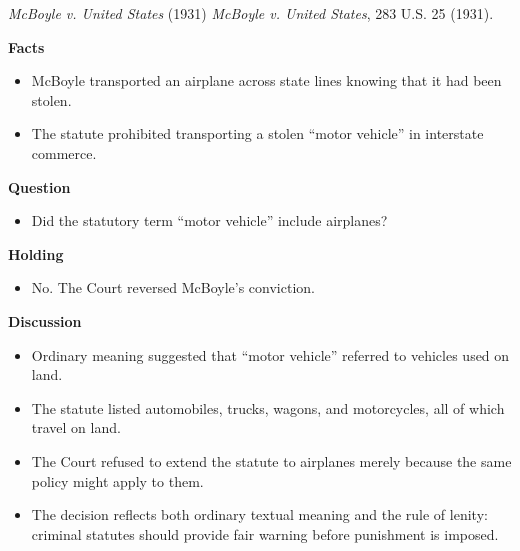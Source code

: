 \documentclass[11pt]{tex/lawoutline}
\begin{document}
\casebox
{\textit{McBoyle v. United States} (1931)}
{\textit{McBoyle v. United States}, 283 U.S. 25 (1931).}
{
\textbf{Facts}
\begin{itemize}
    \item McBoyle transported an airplane across state lines knowing that it had been stolen.
    \item The statute prohibited transporting a stolen ``motor vehicle'' in interstate commerce.
\end{itemize}

\textbf{Question}
\begin{itemize}
    \item Did the statutory term ``motor vehicle'' include airplanes?
\end{itemize}

\textbf{Holding}
\begin{itemize}
    \item No. The Court reversed McBoyle's conviction.
\end{itemize}

\textbf{Discussion}
\begin{itemize}
    \item Ordinary meaning suggested that ``motor vehicle'' referred to vehicles used on land.
    \item The statute listed automobiles, trucks, wagons, and motorcycles, all of which travel on land.
    \item The Court refused to extend the statute to airplanes merely because the same policy might apply to them.
    \item The decision reflects both ordinary textual meaning and the rule of lenity: criminal statutes should provide fair warning before punishment is imposed.
\end{itemize}
}
\end{document}
